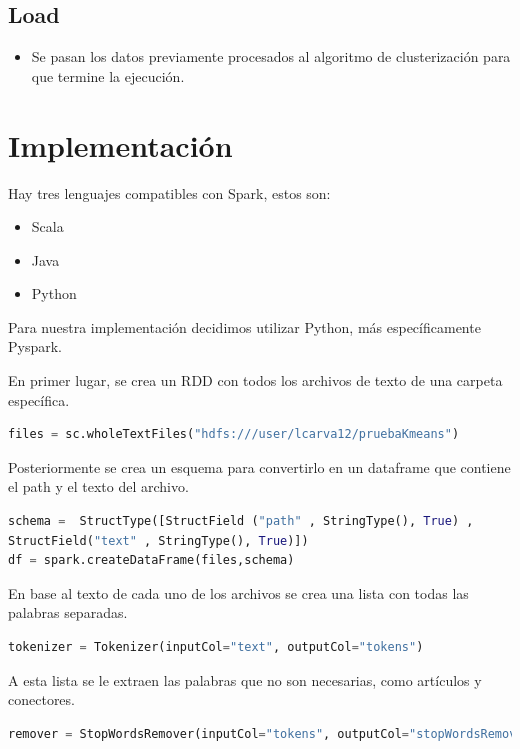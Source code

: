 \documentclass[fleqn,10pt]{SelfArx} %
\begin{document}
\subsection{Load}
\begin{itemize}
\item Se pasan los datos previamente procesados al algoritmo de clusterización para que termine la ejecución.
\end{itemize}





\section{Implementación}
Hay tres lenguajes compatibles con Spark, estos son:
\begin{itemize}
  \item Scala
  \item Java
  \item Python
\end{itemize}
Para nuestra implementación decidimos utilizar Python, más específicamente Pyspark.

En primer lugar, se crea un RDD con todos los archivos de texto de una carpeta específica.

\begin{lstlisting}[language=Python]
files = sc.wholeTextFiles("hdfs:///user/lcarva12/pruebaKmeans")
\end{lstlisting}

Posteriormente se crea un esquema para convertirlo en un dataframe que contiene el path y el texto del archivo.

\begin{lstlisting}[language=Python]
schema =  StructType([StructField ("path" , StringType(), True) , 
StructField("text" , StringType(), True)]) 
df = spark.createDataFrame(files,schema)
\end{lstlisting}

En base al texto de cada uno de los archivos se crea una lista con todas las palabras separadas.
	
\begin{lstlisting}[language=Python]
tokenizer = Tokenizer(inputCol="text", outputCol="tokens")
\end{lstlisting}	

A esta lista se le extraen las palabras que no son necesarias, como artículos y conectores.

\begin{lstlisting}[language=Python]
remover = StopWordsRemover(inputCol="tokens", outputCol="stopWordsRemovedTokens")
\end{lstlisting}
\end{document}

